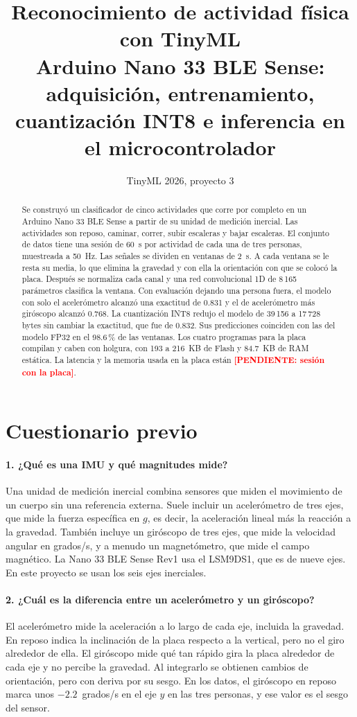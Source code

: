 \documentclass[11pt,a4paper]{article}
\title{Reconocimiento de actividad física con TinyML\\[2pt]
\large Arduino Nano 33 BLE Sense: adquisición, entrenamiento, cuantización INT8 e inferencia en el microcontrolador}
\author{\pendiente{nombres de los integrantes}}
\date{TinyML 2026, proyecto 3}
\newcommand{\pendiente}[1]{\textcolor{red}{\textbf{[PENDIENTE: #1]}}}
\begin{document}
\maketitle

\begin{abstract}
Se construyó un clasificador de cinco actividades que corre por completo en un Arduino Nano 33 BLE Sense a partir de su unidad de medición inercial. Las actividades son reposo, caminar, correr, subir escaleras y bajar escaleras. El conjunto de datos tiene una sesión de 60~s por actividad de cada una de tres personas, muestreada a 50~Hz. Las señales se dividen en ventanas de 2~s. A cada ventana se le resta su media, lo que elimina la gravedad y con ella la orientación con que se colocó la placa. Después se normaliza cada canal y una red convolucional 1D de 8\,165 parámetros clasifica la ventana. Con evaluación dejando una persona fuera, el modelo con solo el acelerómetro alcanzó una exactitud de 0.831 y el de acelerómetro más giróscopo alcanzó 0.768. La cuantización INT8 redujo el modelo de 39\,156 a 17\,728 bytes sin cambiar la exactitud, que fue de 0.832. Sus predicciones coinciden con las del modelo FP32 en el 98.6\,\% de las ventanas. Los cuatro programas para la placa compilan y caben con holgura, con 193 a 216~KB de Flash y 84.7~KB de RAM estática. La latencia y la memoria usada en la placa están \pendiente{sesión con la placa}.
\end{abstract}

\section{Cuestionario previo}

\paragraph{1. ¿Qué es una IMU y qué magnitudes mide?}
Una unidad de medición inercial combina sensores que miden el movimiento de un cuerpo sin una referencia externa. Suele incluir un acelerómetro de tres ejes, que mide la fuerza específica en $g$, es decir, la aceleración lineal más la reacción a la gravedad. También incluye un giróscopo de tres ejes, que mide la velocidad angular en grados/s, y a menudo un magnetómetro, que mide el campo magnético. La Nano 33 BLE Sense Rev1 usa el LSM9DS1, que es de nueve ejes. En este proyecto se usan los seis ejes inerciales.

\paragraph{2. ¿Cuál es la diferencia entre un acelerómetro y un giróscopo?}
El acelerómetro mide la aceleración a lo largo de cada eje, incluida la gravedad. En reposo indica la inclinación de la placa respecto a la vertical, pero no el giro alrededor de ella. El giróscopo mide qué tan rápido gira la placa alrededor de cada eje y no percibe la gravedad. Al integrarlo se obtienen cambios de orientación, pero con deriva por su sesgo. En los datos, el giróscopo en reposo marca unos $-2.2$~grados/s en el eje $y$ en las tres personas, y ese valor es el sesgo del sensor.
\end{document}
